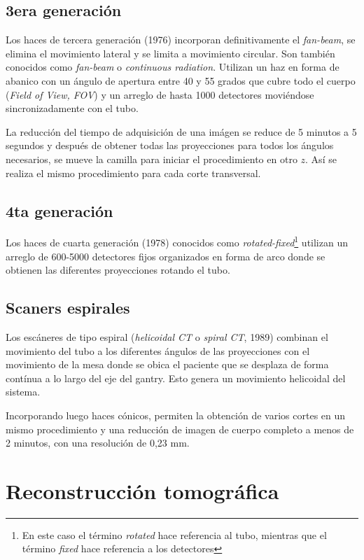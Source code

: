 \subsection{3era generaci\'on}

Los haces de tercera generación (1976) incorporan definitivamente el \emph{fan-beam}, se elimina el movimiento lateral y se limita a movimiento circular. Son también conocidos como \emph{fan-beam} o \emph{continuous radiation}. Utilizan un haz en forma de abanico con un ángulo de apertura entre 40 y 55 grados que cubre todo el cuerpo (\emph{Field of View, FOV}) y un arreglo de hasta 1000 detectores moviéndose sincronizadamente con el tubo.

La reducción del tiempo de adquisición de una imágen se reduce de 5 minutos a 5 segundos y después de obtener todas las proyecciones para todos los ángulos necesarios, se mueve la camilla para iniciar el procedimiento en otro $z$. Así se realiza el mismo procedimiento para cada corte transversal.

\subsection{4ta generaci\'on}

Los haces de cuarta generación (1978) conocidos como \emph{rotated-fixed}\footnote{En este caso el término \emph{rotated} hace referencia al tubo, mientras que el término \emph{fixed} hace referencia a los detectores} utilizan un arreglo de 600-5000 detectores fijos organizados en forma de arco donde se obtienen las diferentes proyecciones rotando el tubo.

\subsection{Scaners espirales}

Los escáneres de tipo espiral (\emph{helicoidal CT} o \emph{spiral CT}, 1989) combinan el movimiento del tubo a los diferentes ángulos de las proyecciones con el movimiento de la mesa donde se obica el paciente que se desplaza de forma contínua a lo largo del eje del gantry. Esto genera un movimiento helicoidal del sistema.

Incorporando luego haces cónicos, permiten la obtención de varios cortes en un mismo procedimiento y una reducción de imagen de cuerpo completo a menos de 2 minutos, con una resolución de 0,23 mm.

\section{Reconstrucci\'on tomogr\'afica}

